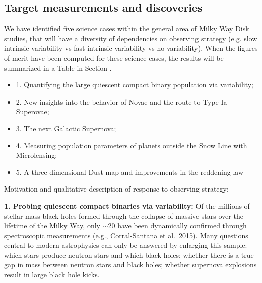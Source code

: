 
\subsection{Target measurements and discoveries}
\label{sec:keyword:MW_Disk_targets}



We have identified five science cases within the general area of Milky
Way Disk studies, that will have a diversity of dependencies on
observing strategy (e.g. slow intrinsic variability vs fast intrinsic
variability vs no variability). When the figures of merit have been
computed for these science cases, the results will be summarized in a Table in Section \label{sec:keyword:MW_Disk_discussion}.

\begin{itemize}
  \item 1. Quantifying the large quiescent compact binary population via variability;
  \item 2. New insights into the behavior of Novae and the route to Type Ia Superovae;
  \item 3. The next Galactic Supernova;
  \item 4. Measuring population parameters of planets outside the Snow Line with Microlensing;
  \item 5. A three-dimensional Dust map and improvements in the reddening law
\end{itemize}

Motivation and qualitative description of response to observing strategy:

{\bf 1. Probing quiescent compact binaries via variability:} Of the
millions of stellar-mass black holes formed through the collapse of
massive stars over the lifetime of the Milky Way, only $\sim 20$ have
been dynamically confirmed through spectroscopic measurements (e.g.,
Corral-Santana et al.~2015). Many questions central to modern
astrophysics can only be answered by enlarging this sample: which
stars produce neutron stars and which black holes; whether there is a
true gap in mass between neutron stars and black holes; whether
supernova explosions result in large black hole kicks. 

